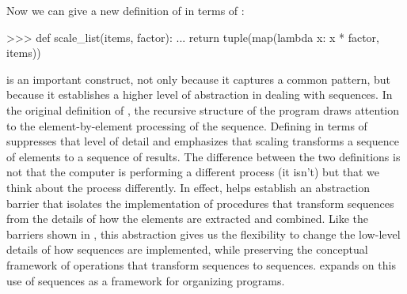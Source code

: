 Now we can give a new definition of  in terms of :

\begin{codeBlock}
>>> def scale_list(items, factor):
...     return tuple(map(lambda x: x * factor, items))
\end{codeBlock}

\noindent
{} is an important construct, not only because it captures a common
pattern, but because it establishes a higher level of abstraction in dealing
with sequences.  In the original definition of , the
recursive structure of the program draws attention to the element-by-element
processing of the sequence.  Defining  in terms of 
suppresses that level of detail and emphasizes that scaling transforms a
sequence of elements to a sequence of results.  The difference between the two
definitions is not that the computer is performing a different process (it
isn't) but that we think about the process differently.  In effect, 
helps establish an abstraction barrier that isolates the implementation of
procedures that transform sequences from the details of how the elements are
extracted and combined.  Like the barriers shown in , this
abstraction gives us the flexibility to change the low-level details of how
sequences are implemented, while preserving the conceptual framework of
operations that transform sequences to sequences.   expands
on this use of sequences as a framework for organizing programs.

